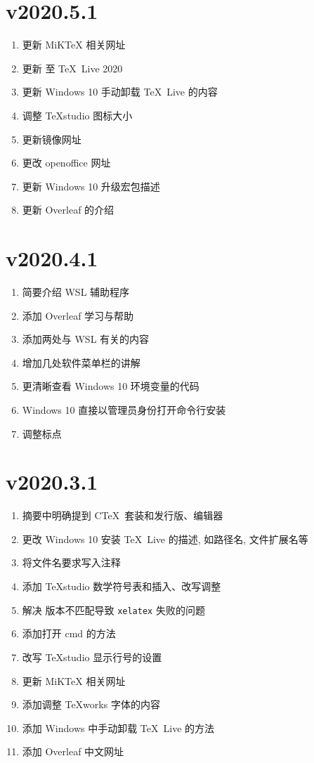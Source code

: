 \section*{v2020.5.1}

\begin{enumerate}
  \item 更新 MiK\TeX{} 相关网址
  \item 更新 至 \TeX\ Live 2020
  \item 更新 Windows 10 手动卸载 \TeX\ Live 的内容
  \item 调整 \TeX studio 图标大小
  \item 更新镜像网址
  \item 更改 openoffice 网址
  \item 更新 Windows 10 升级宏包描述
  \item 更新 Overleaf 的介绍
\end{enumerate}

\section*{v2020.4.1}

\begin{enumerate}
  \item 简要介绍 WSL 辅助程序
  \item 添加 Overleaf 学习与帮助
  \item 添加两处与 WSL 有关的内容
  \item 增加几处软件菜单栏的讲解
  \item 更清晰查看 Windows 10 环境变量的代码
  \item Windows 10 直接以管理员身份打开命令行安装
  \item 调整标点
\end{enumerate}

\section*{v2020.3.1}

\begin{enumerate}
    \item 摘要中明确提到 C\TeX\ 套装和发行版、编辑器
    \item 更改 Windows 10 安装 \TeX\ Live 的描述, 如路径名, 文件扩展名等
    \item 将文件名要求写入注释
    \item 添加 \TeX studio 数学符号表和插入、改写调整
    \item 解决 \LaTeXe 版本不匹配导致 \texttt{xelatex} 失败的问题
    \item 添加打开 \textsf{cmd} 的方法
    \item 改写 \TeX studio 显示行号的设置
    \item 更新 MiK\TeX{} 相关网址
    \item 添加调整 \TeX works 字体的内容
    \item 添加 Windows 中手动卸载 \TeX\ Live 的方法
    \item 添加 Overleaf 中文网址
\end{enumerate}

